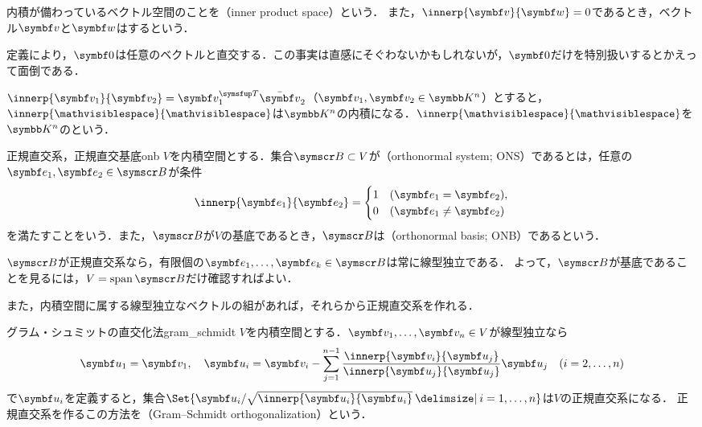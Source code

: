 \documentclass[../../main]{subfiles}
\begin{document}
内積が備わっているベクトル空間のことを（inner product space）という．
また，\(\innerp{\vect{v}}{\vect{w}}=0\)であるとき，ベクトル\(\vect{v}\)と\(\vect{w}\)はするという．

\begin{note}
  定義により，\(\zvec\)は任意のベクトルと直交する．この事実は直感にそぐわないかもしれないが，\(\zvec\)だけを特別扱いするとかえって面倒である．
\end{note}

\begin{example}[標準内積]
  \(\innerp{\vect{v}_1}{\vect{v}_2}=\trps{\vect{v}_1}\conj{\vect{v}}_2\)（\(\vect{v}_1,\vect{v}_2\in\numset{K}^n\)）とすると，
  \(\innerp{\holder}{\holder}\)は\(\numset{K}^n\)の内積になる．\(\innerp{\holder}{\holder}\)を\(\numset{K}^n\)のという．
\end{example}

\begin{definition}{正規直交系，正規直交基底}{onb}
  \(V\)を内積空間とする．集合\(\basis{B}\subset V\)が（orthonormal system; ONS）であるとは，任意の\(\vect{e}_1,\vect{e}_2\in\basis{B}\)が条件
  \[
    \innerp{\vect{e}_1}{\vect{e}_2} = \begin{cases}1 & (\vect{e}_1=\vect{e}_2),\\ 0 & (\vect{e}_1\neq\vect{e}_2)\end{cases}
  \]
  を満たすことをいう．また，\(\basis{B}\)が\(V\)の基底であるとき，\(\basis{B}\)は（orthonormal basis; ONB）であるという．
\end{definition}

\(\basis{B}\)が正規直交系なら，有限個の\(\vect{e}_1,\dots,\vect{e}_k\in\basis{B}\)は常に線型独立である．
よって，\(\basis{B}\)が基底であることを見るには，\(V=\spannedby\basis{B}\)だけ確認すればよい．

また，内積空間に属する線型独立なベクトルの組があれば，それらから正規直交系を作れる．

\begin{proposition}{グラム・シュミットの直交化法}{gram_schmidt}
  \(V\)を内積空間とする．\(\vect{v}_1,\dots,\vect{v}_n\in V\)が線型独立なら
  \[
    \vect{u}_1 = \vect{v}_1,
    \quad\vect{u}_i = \vect{v}_i-\sum_{j=1}^{n-1}\frac{\innerp{\vect{v}_i}{\vect{u}_j}}{\innerp{\vect{u}_j}{\vect{u}_j}}\vect{u}_j\quad(i=2,\dots,n)
  \]
  で\(\vect{u}_i\)を定義すると，集合\(\Set{\vect{u}_i/\sqrt{\innerp{\vect{u}_i}{\vect{u}_i}}\given i=1,\dots,n}\)は\(V\)の正規直交系になる．
  正規直交系を作るこの方法を（Gram–Schmidt orthogonalization）という．
\end{proposition}
\end{document}
